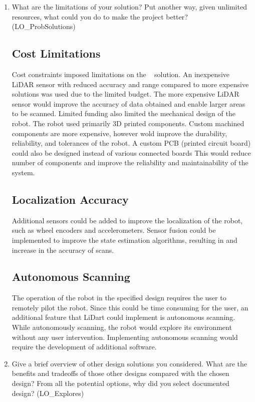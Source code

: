 \documentclass[12pt, titlepage]{article}
\begin{document}
\begin{enumerate}
  \item What are the limitations of your solution?  Put another way, given
  unlimited resources, what could you do to make the project better? (LO\_ProbSolutions)
  
\subsection{Cost Limitations}
Cost constraints imposed limitations on the \progname~ solution. An inexpensive LiDAR sensor with reduced accuracy and range compared to more expensive solutions was used due to the limited budget. The more expensive LiDAR sensor would improve the accuracy of data obtained and enable larger areas to be scanned. Limited funding also limited the mechanical design of the robot. The robot used primarily 3D printed components. Custom machined components are more expensive, however wold improve the durability, reliability, and tolerances of the robot. A custom PCB (printed circuit board) could also be designed instead of various connected boards This would reduce number of components and improve the reliability and maintainability of the system.
  
\subsection{Localization Accuracy}
Additional sensors could be added to improve the localization of the robot, such as wheel encoders and accelerometers. Sensor fusion could be implemented to improve the state estimation algorithms, resulting in and increase in the accuracy of scans.
  
\subsection{Autonomous Scanning}
The operation of the robot in the specified design requires the user to remotely pilot the robot. Since this could be time consuming for the user, an additional feature that LiDart could implement is autonomous scanning. While autonomously scanning, the robot would explore its environment without any user intervention. Implementing autonomous scanning would require the development of additional software.\\
  
  \item Give a brief overview of other design solutions you considered.  What
  are the benefits and tradeoffs of those other designs compared with the chosen
  design?  From all the potential options, why did you select documented design?
  (LO\_Explores)
  

\end{enumerate}
\end{document}
